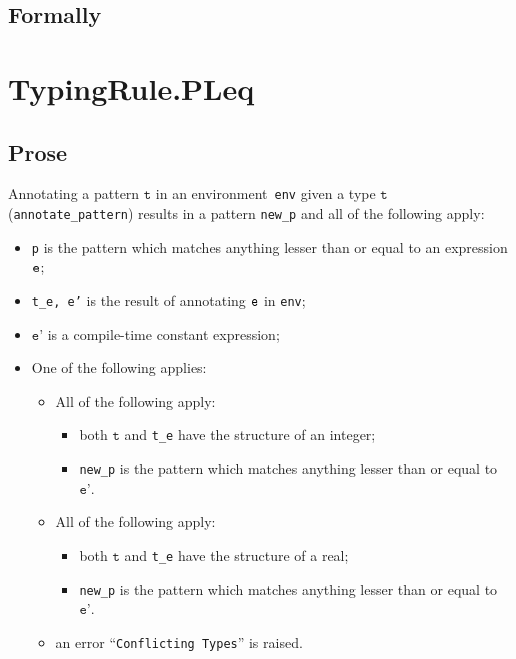 \documentclass{book}
\newcommand\vt[0]{\texttt{t}}
\newcommand\vep[0]{\texttt{e'}}
\begin{document}
\begin{itemize}

\begin{emptyformal}
    \subsection{Formally}
\end{emptyformal}


 \section{TypingRule.PLeq \label{sec:TypingRule.PLeq}}

  \subsection{Prose}
   Annotating a pattern $\vt$ in an environment~\texttt{env} given a type $\vt$ (\texttt{annotate\_pattern}) results in a pattern \texttt{new\_p} and all of the following apply:
   \begin{itemize}
   \item \texttt{p} is the pattern which matches anything lesser than or equal to an expression $\texttt{e}$;
   \item \texttt{t\_e, e'} is the result of annotating $\texttt{e}$ in \texttt{env};
   \item $\vep$ is a compile-time constant expression;
   \item One of the following applies:
     \begin{itemize}
     \item All of the following apply:
           \begin{itemize}
           \item both $\vt$ and \texttt{t\_e} have the structure of an integer;
           \item \texttt{new\_p} is the pattern which matches anything lesser than or equal to $\vep$.
           \end{itemize}
     \item All of the following apply:
           \begin{itemize}
           \item both $\vt$ and \texttt{t\_e} have the structure of a real;
           \item \texttt{new\_p} is the pattern which matches anything lesser than or equal to $\vep$.
           \end{itemize}
     \item an error ``\texttt{Conflicting Types}'' is raised.
     \end{itemize}
   \end{itemize}


\end{itemize}
\end{document}
